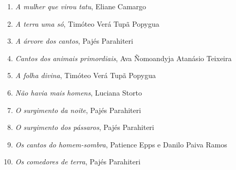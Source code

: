 \begin{enumerate}
\setlength\parskip{4.2pt}
\setlength\itemsep{-1.4mm}
\item \textit{A mulher que virou tatu}, Eliane Camargo
\item \textit{A terra uma só}, Timóteo Verá Tupã Popygua
\item \textit{A árvore dos cantos}, Pajés Parahiteri
\item \textit{Cantos dos animais primordiais}, Ava Ñomoandyja Atanásio Teixeira
\item \textit{A folha divina}, Timóteo Verá Tupã Popygua
\item \textit{Não havia mais homens}, Luciana Storto
\item \textit{O surgimento da noite}, Pajés Parahiteri
\item \textit{O surgimento dos pássaros}, Pajés Parahiteri
\item \textit{Os cantos do homem-sombra}, Patience Epps e Danilo Paiva Ramos
\item \textit{Os comedores de terra}, Pajés Parahiteri
\end{enumerate}



